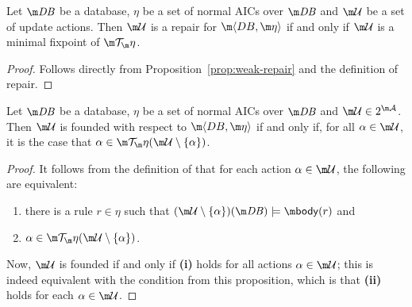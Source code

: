 \begin{proposition}
  \label{prop:repair}
  Let $\db$ be a database, $\eta$ be a set of normal AICs over $\db$ and $\UU$ be a set of update actions.
  Then $\UU$ is a repair for $\fulldb$ if and only if $\UU$ is a minimal fixpoint of $\Op$.
\end{proposition}
\begin{proof}
  Follows directly from Proposition~\ref{prop:weak-repair} and the definition of repair.
\end{proof}

\begin{proposition}
  \label{prop:founded-char}
  Let $\db$ be a database, $\eta$ be a set of normal AICs over $\db$ and $\UU\in 2^{\acts}$. %
  Then $\UU$ is founded with respect to $\fulldb$ if and only if, for all $\alpha\in\UU$, it is the case that $\alpha\in\Op(\UU\setminus\{\alpha\})$.
\end{proposition}
\begin{proof}
  It follows from the definition of \Op that for each action $\alpha\in \UU$, the following are equivalent:
  \begin{enumerate}
   \item there is a rule $r\in\eta$ such that $(\UU\setminus\{\alpha\})(\db)\models\body(r)$ and 
   \item $\alpha\in\Op(\UU\setminus\{\alpha\})$.
  \end{enumerate}
  Now, $\UU$ is founded if and only if \textbf{(i)} holds for all actions $\alpha\in \UU$; this is indeed equivalent with the condition from this proposition, which is that \textbf{(ii)} holds for each $\alpha\in \UU$. 
\end{proof} 

